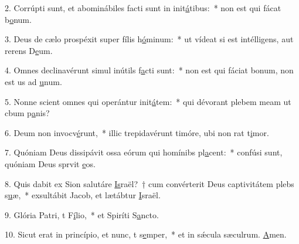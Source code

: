 2. Corrúpti sunt, et abominábiles facti sunt in init\uline{á}tibus:~* non est qui fácat b\uline{o}num.\par 
3. Deus de cælo prospéxit super fílis h\uline{ó}minum:~* ut vídeat si est intélligens, aut rerens D\uline{e}um.\par 
4. Omnes declinavérunt simul inútils f\uline{a}cti sunt:~* non est qui fáciat bonum, non est us ad \uline{u}num.\par 
5. Nonne scient omnes qui operántur init\uline{á}tem:~* qui dévorant plebem meam ut cbum p\uline{a}nis?\par 
6. Deum non invocv\uline{é}runt,~* illic trepidavérunt timóre, ubi non rat t\uline{i}mor.\par 
7. Quóniam Deus dissipávit ossa eórum qui homínibs pl\uline{a}cent:~* confúsi sunt, quóniam Deus sprvit \uline{e}os.\par 
8. Quis dabit ex Sion salutáre \uline{Is}raël?~† cum convérterit Deus captivitátem plebs s\uline{u}æ,~* exsultábit Jacob, et lætábtur \uline{I}sraël.\par 
9. Glória Patri, t F\uline{í}lio,~* et Spiríti S\uline{a}ncto.\par 
10. Sicut erat in princípio, et nunc, t s\uline{e}mper,~* et in sǽcula sæculrum. \uline{A}men.\par 
